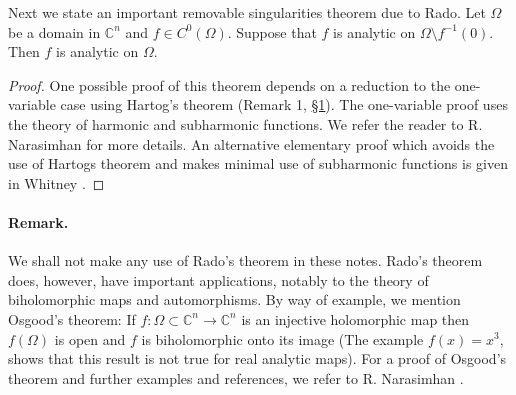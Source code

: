 Next we state an important removable singularities theorem due to Rado.
 Let $\Omega$ be a domain in $\mathbb C^n$ and $f\in C^0(\Omega)$. Suppose that $f$ is analytic on $\Omega\setminus f^{-1}(0)$. Then $f$ is analytic on $\Omega$.
\begin{proof}
One possible proof of this theorem depends on a reduction to the one-variable case using Hartog's theorem (Remark 1, \hyperref[sec:2:1]{\S1}). The one-variable proof uses the theory of harmonic and subharmonic functions. We refer the reader to R. Narasimhan \cite{bib:I:narasimhan-r:2} for more details. An alternative elementary proof which avoids the use of Hartogs theorem and makes minimal use of subharmonic functions is given in Whitney \cite{bib:I:whitney-h:1}.
\end{proof}
\paragraph*{Remark.} We shall not make any use of Rado's theorem in these notes. Rado's theorem does, however, have important applications, notably to the theory of biholomorphic maps and automorphisms. By way of example, we mention Osgood's theorem: If $f:\Omega\subset\mathbb C^n\to\mathbb C^n$ is an injective holomorphic map then $f(\Omega)$ is open and $f$ is biholomorphic onto its image (The example $f(x)=x^3$, shows that this result is not true for real
analytic maps). For a proof of Osgood's theorem and further examples and references, we refer to R. Narasimhan \cite{bib:I:narasimhan-r:2}.

